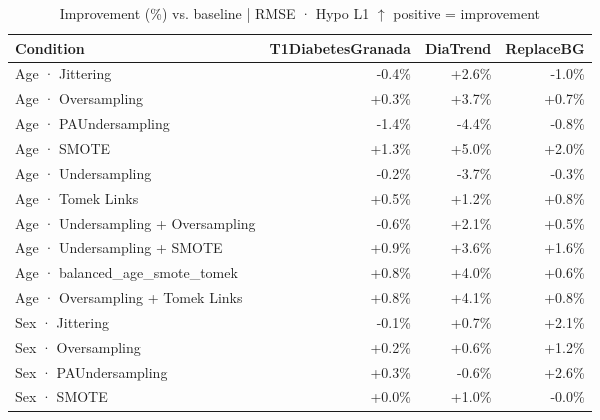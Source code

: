 \begin{table}[htbp]
\centering
\small
\caption{Improvement (\%) vs. baseline  |  RMSE · Hypo L1  $\uparrow$ positive = improvement}
\label{tab:delta_rmse_tbr_1}
\begin{tabular}{lrrr}
\toprule
\textbf{Condition} & \textbf{T1DiabetesGranada} & \textbf{DiaTrend} & \textbf{ReplaceBG} \\
\midrule
Age · Jittering & \textcolor{BrickRed}{-0.4\%} & \textcolor{OliveGreen}{+2.6\%} & \textcolor{BrickRed}{-1.0\%} \\
Age · Oversampling & \textcolor{OliveGreen}{+0.3\%} & \textcolor{OliveGreen}{+3.7\%} & \textcolor{OliveGreen}{+0.7\%} \\
Age · PAUndersampling & \textcolor{BrickRed}{-1.4\%} & \textcolor{BrickRed}{-4.4\%} & \textcolor{BrickRed}{-0.8\%} \\
Age · SMOTE & \textcolor{OliveGreen}{+1.3\%} & \textcolor{OliveGreen}{+5.0\%} & \textcolor{OliveGreen}{+2.0\%} \\
Age · Undersampling & \textcolor{BrickRed}{-0.2\%} & \textcolor{BrickRed}{-3.7\%} & \textcolor{BrickRed}{-0.3\%} \\
Age · Tomek Links & \textcolor{OliveGreen}{+0.5\%} & \textcolor{OliveGreen}{+1.2\%} & \textcolor{OliveGreen}{+0.8\%} \\
Age · Undersampling + Oversampling & \textcolor{BrickRed}{-0.6\%} & \textcolor{OliveGreen}{+2.1\%} & \textcolor{OliveGreen}{+0.5\%} \\
Age · Undersampling + SMOTE & \textcolor{OliveGreen}{+0.9\%} & \textcolor{OliveGreen}{+3.6\%} & \textcolor{OliveGreen}{+1.6\%} \\
Age · balanced_age_smote_tomek & \textcolor{OliveGreen}{+0.8\%} & \textcolor{OliveGreen}{+4.0\%} & \textcolor{OliveGreen}{+0.6\%} \\
Age · Oversampling + Tomek Links & \textcolor{OliveGreen}{+0.8\%} & \textcolor{OliveGreen}{+4.1\%} & \textcolor{OliveGreen}{+0.8\%} \\
\midrule
Sex · Jittering & \textcolor{BrickRed}{-0.1\%} & \textcolor{OliveGreen}{+0.7\%} & \textcolor{OliveGreen}{+2.1\%} \\
Sex · Oversampling & \textcolor{OliveGreen}{+0.2\%} & \textcolor{OliveGreen}{+0.6\%} & \textcolor{OliveGreen}{+1.2\%} \\
Sex · PAUndersampling & \textcolor{OliveGreen}{+0.3\%} & \textcolor{BrickRed}{-0.6\%} & \textcolor{OliveGreen}{+2.6\%} \\
Sex · SMOTE & \textcolor{OliveGreen}{+0.0\%} & \textcolor{OliveGreen}{+1.0\%} & \textcolor{BrickRed}{-0.0\%} \\

\end{tabular}
\end{table}
